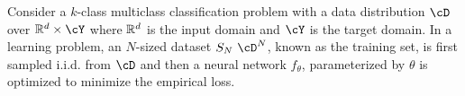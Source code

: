 Consider a $k$-class multiclass classification problem with a data distribution
\(\cD\) over \(\reals^d\times\cY\) where \(\mathbb{R}^d\) is the input domain and
\(\cY\) is the target domain. In a learning problem, an $N$-sized dataset
\(S_N~\cD^N\), known as the training set, is  first sampled i.i.d. from \(\cD\)
and then a neural network \(f_\theta\), parameterized by \(\theta\) is optimized to minimize the empirical loss.